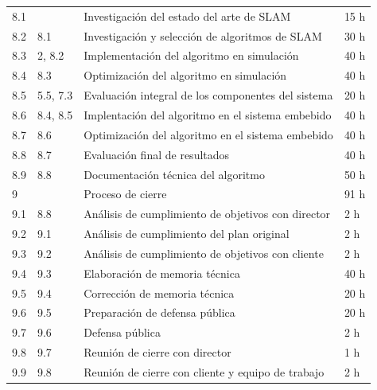 \documentclass[
11pt, %
codirector, %
]{charter}
\begin{document}
\begin{table}[htpb]
\begin{tabular}{@{}llll@{}}
8.1             &                      & Investigación del estado del arte de SLAM          & 15 h               \\
8.2             & 8.1                  & Investigación y selección de algoritmos de SLAM    & 30 h               \\
8.3             & 2, 8.2               & Implementación del algoritmo en simulación         & 40 h               \\
8.4             & 8.3                  & Optimización del algoritmo en simulación           & 40 h               \\
8.5             & 5.5, 7.3             & Evaluación integral de los componentes del sistema & 20 h               \\
8.6             & 8.4, 8.5             & Implentación del algoritmo en el sistema embebido  & 40 h               \\
8.7             & 8.6                  & Optimización del algoritmo en el sistema embebido  & 40 h               \\
8.8             & 8.7                  & Evaluación final de resultados                     & 40 h               \\
8.9             & 8.8                  & Documentación técnica del algoritmo                & 50 h               \\
9               &                      & Proceso de cierre                                  & 91 h               \\ 
9.1             & 8.8                  & Análisis de cumplimiento de objetivos con director & 2 h                \\ 
9.2             & 9.1                  & Análisis de cumplimiento del plan original         & 2 h                \\ 
9.3             & 9.2                  & Análisis de cumplimiento de objetivos con cliente  & 2 h                \\ 
9.4             & 9.3                  & Elaboración de memoria técnica                     & 40 h               \\ 
9.5             & 9.4                  & Corrección de memoria técnica                      & 20 h               \\
9.6             & 9.5                  & Preparación de defensa pública                     & 20 h               \\
9.7             & 9.6                  & Defensa pública                                    & 2 h                \\
9.8             & 9.7                  & Reunión de cierre con director                     & 1 h                \\
9.9             & 9.8                  & Reunión de cierre con cliente y equipo de trabajo  & 2 h                \\ \bottomrule
\end{tabular}
\end{table}
\end{document}
